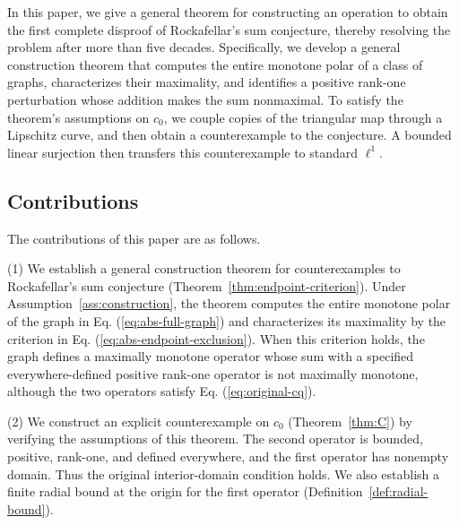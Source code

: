 \documentclass[11pt]{article}
\theoremstyle{definition}
\theoremstyle{remark}
\begin{document}

In this paper, we give a general theorem for constructing an operation to obtain the first complete disproof of Rockafellar's sum conjecture, thereby resolving the problem after more than five decades. 
Specifically, we develop a general construction theorem that computes the entire monotone polar of a class of graphs, characterizes their maximality, and identifies a positive rank-one perturbation whose addition makes the sum nonmaximal. To satisfy the theorem's assumptions on $c_0$, we couple copies of the triangular map through a Lipschitz curve, and then obtain a counterexample to the conjecture. A bounded linear surjection then transfers this counterexample to standard $\ell^1$.

\subsection{Contributions}
The contributions of this paper are as follows.

(1) We establish a general construction theorem for counterexamples to Rockafellar's sum conjecture (Theorem~\ref{thm:endpoint-criterion}). Under Assumption~\ref{ass:construction}, the theorem computes the entire monotone polar of the graph in Eq. (\ref{eq:abs-full-graph}) and characterizes its maximality by the criterion in Eq. (\ref{eq:abs-endpoint-exclusion}). When this criterion holds, the graph defines a maximally monotone operator whose sum with a specified everywhere-defined positive rank-one operator is not maximally monotone, although the two operators satisfy Eq. (\ref{eq:original-cq}).

(2) We construct an explicit counterexample on $c_0$ (Theorem~\ref{thm:C}) by verifying the assumptions of this theorem. The second operator is bounded, positive, rank-one, and defined everywhere, and the first operator has nonempty domain. Thus the original interior-domain condition holds. We also establish a finite radial bound at the origin for the first operator (Definition~\ref{def:radial-bound}).
\end{document}
